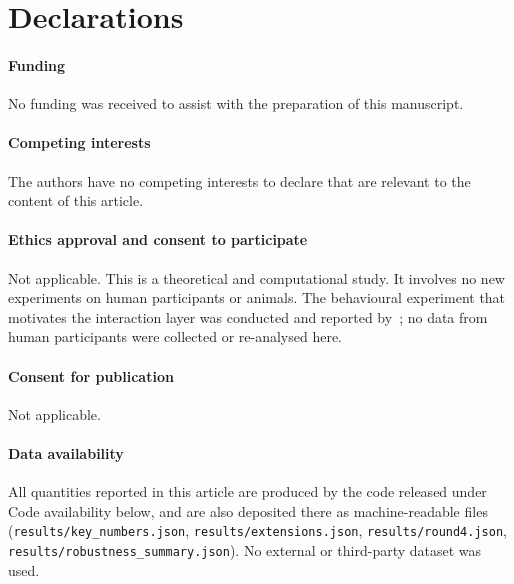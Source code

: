 \backmatter


\section*{Declarations}

\paragraph{Funding}
No funding was received to assist with the preparation of this manuscript.

\paragraph{Competing interests}
The authors have no competing interests to declare that are relevant to the
content of this article.

\paragraph{Ethics approval and consent to participate}
Not applicable. This is a theoretical and computational study. It involves no
new experiments on human participants or animals. The behavioural experiment
that motivates the interaction layer was conducted and reported
by~\citet{domingos2026falling}; no data from human participants were collected
or re-analysed here.

\paragraph{Consent for publication}
Not applicable.

\paragraph{Data availability}
All quantities reported in this article are produced by the code released under
Code availability below, and are also deposited there as machine-readable files
(\texttt{results/key\_numbers.json}, \texttt{results/extensions.json},
\texttt{results/round4.json}, \texttt{results/robustness\_summary.json}).
No external or third-party dataset was used.

